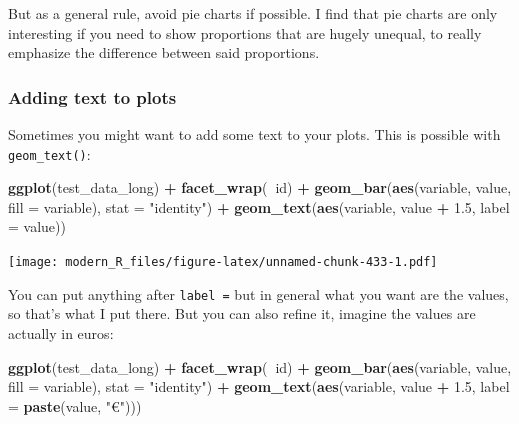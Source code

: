 \documentclass[]{gitbook}
\newenvironment{Shaded}{\begin{snugshade}}{\end{snugshade}}
\newcommand{\DataTypeTok}[1]{\textcolor[rgb]{0.13,0.29,0.53}{#1}}
\newcommand{\FloatTok}[1]{\textcolor[rgb]{0.00,0.00,0.81}{#1}}
\newcommand{\KeywordTok}[1]{\textcolor[rgb]{0.13,0.29,0.53}{\textbf{#1}}}
\newcommand{\NormalTok}[1]{#1}
\newcommand{\OperatorTok}[1]{\textcolor[rgb]{0.81,0.36,0.00}{\textbf{#1}}}
\newcommand{\StringTok}[1]{\textcolor[rgb]{0.31,0.60,0.02}{#1}}
\begin{document}
But as a general rule, avoid pie charts if possible. I find that pie charts are only interesting if
you need to show proportions that are hugely unequal, to really emphasize the difference between
said proportions.

\hypertarget{adding-text-to-plots}{%
\subsubsection{Adding text to plots}\label{adding-text-to-plots}}

Sometimes you might want to add some text to your plots. This is possible with \texttt{geom\_text()}:

\begin{Shaded}
\begin{Highlighting}[]
\KeywordTok{ggplot}\NormalTok{(test_data_long) }\OperatorTok{+}
\StringTok{  }\KeywordTok{facet_wrap}\NormalTok{(}\OperatorTok{~}\NormalTok{id) }\OperatorTok{+}
\StringTok{  }\KeywordTok{geom_bar}\NormalTok{(}\KeywordTok{aes}\NormalTok{(variable, value, }\DataTypeTok{fill =}\NormalTok{ variable), }\DataTypeTok{stat =} \StringTok{"identity"}\NormalTok{) }\OperatorTok{+}
\StringTok{  }\KeywordTok{geom_text}\NormalTok{(}\KeywordTok{aes}\NormalTok{(variable, value }\OperatorTok{+}\StringTok{ }\FloatTok{1.5}\NormalTok{, }\DataTypeTok{label =}\NormalTok{ value))}
\end{Highlighting}
\end{Shaded}

\texttt{[image: modern\_R\_files/figure-latex/unnamed-chunk-433-1.pdf]}

You can put anything after \texttt{label\ =} but in general what you want are the values, so that's what
I put there. But you can also refine it, imagine the values are actually in euros:

\begin{Shaded}
\begin{Highlighting}[]
\KeywordTok{ggplot}\NormalTok{(test_data_long) }\OperatorTok{+}
\StringTok{  }\KeywordTok{facet_wrap}\NormalTok{(}\OperatorTok{~}\NormalTok{id) }\OperatorTok{+}
\StringTok{  }\KeywordTok{geom_bar}\NormalTok{(}\KeywordTok{aes}\NormalTok{(variable, value, }\DataTypeTok{fill =}\NormalTok{ variable), }\DataTypeTok{stat =} \StringTok{"identity"}\NormalTok{) }\OperatorTok{+}
\StringTok{  }\KeywordTok{geom_text}\NormalTok{(}\KeywordTok{aes}\NormalTok{(variable, value }\OperatorTok{+}\StringTok{ }\FloatTok{1.5}\NormalTok{, }\DataTypeTok{label =} \KeywordTok{paste}\NormalTok{(value, }\StringTok{"€"}\NormalTok{)))}
\end{Highlighting}
\end{Shaded}
\end{document}
